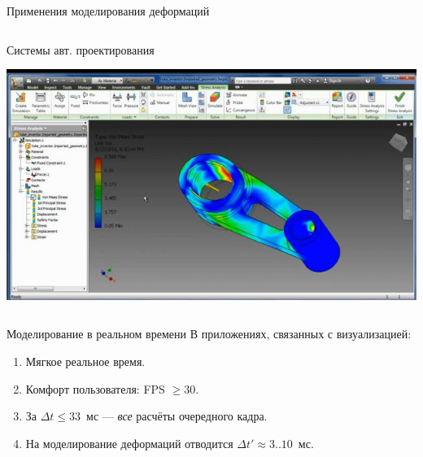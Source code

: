 \documentclass[usenames,dvipsnames,pdftex,unicode,hidelinks]{beamer}
\renewcommand{\le}{\leqslant} %
\renewcommand{\ge}{\geqslant} %
\begin{document}
\begin{frame}{Применения моделирования деформаций}
\begin{columns}[c]
\begin{column}{0.5\textwidth}
\begin{center}
          Системы авт. проектирования

          \includegraphics[height=0.3\textheight]{cad}
        \end{center}
      \end{column}
    \end{columns}
  \end{frame}
  \begin{frame}{Моделирование в реальном времени}
    В приложениях, связанных с визуализацией:
    \begin{enumerate}
      \item \alert{Мягкое} реальное время.
      \item Комфорт пользователя: FPS $\ge 30$.
      \item За $\Delta t \le 33$~мс --- \emph{все} расчёты очередного кадра.
      \item На моделирование деформаций отводится \alert{$\Delta t' \approx 3..10$~мс}.
    \end{enumerate}

    \vspace{5mm}

    \begin{center}
    \end{center}
  \end{frame}
\end{document}

